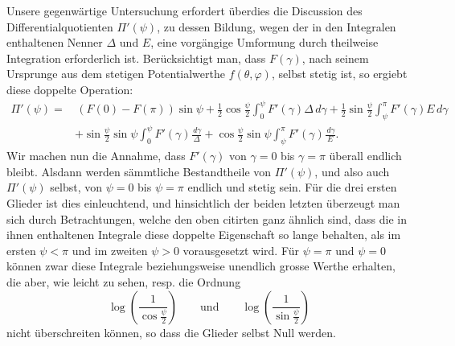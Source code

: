 \documentclass[11pt]{article}
\newcommand{\dd}{\,d}
\begin{document}
Unsere gegenwärtige Untersuchung erfordert überdies die Discussion des Differentialquotienten $\Pi'(\psi)$, zu dessen Bildung, wegen der in den Integralen enthaltenen Nenner $\Delta$ und $E$, eine vorgängige Umformung durch theilweise Integration erforderlich ist. Berücksichtigt man, dass $F(\gamma)$, nach seinem Ursprunge aus dem stetigen Potentialwerthe $f(\theta,\varphi)$, selbst stetig ist, so ergiebt diese doppelte Operation:
\begin{align*}
\Pi'(\psi)=&\,(F(0)-F(\pi))\sin\psi
+\frac12\cos\frac{\psi}{2}\int_0^\psi F'(\gamma)\Delta\dd\gamma
+\frac12\sin\frac{\psi}{2}\int_\psi^\pi F'(\gamma)E\dd\gamma \\
&+\sin\frac{\psi}{2}\sin\psi\int_0^\psi F'(\gamma)\frac{\dd\gamma}{\Delta}
+\cos\frac{\psi}{2}\sin\psi\int_\psi^\pi F'(\gamma)\frac{\dd\gamma}{E}.
\end{align*}
Wir machen nun die Annahme, dass $F'(\gamma)$ von $\gamma=0$ bis $\gamma=\pi$ überall endlich bleibt. Alsdann werden sämmtliche Bestandtheile von $\Pi'(\psi)$, und also auch $\Pi'(\psi)$ selbst, von $\psi=0$ bis $\psi=\pi$ endlich und stetig sein. Für die drei ersten Glieder ist dies einleuchtend, und hinsichtlich der beiden letzten überzeugt man sich durch Betrachtungen, welche den oben citirten ganz ähnlich sind, dass die in ihnen enthaltenen Integrale diese doppelte Eigenschaft so lange behalten, als im ersten $\psi<\pi$ und im zweiten $\psi>0$ vorausgesetzt wird. Für $\psi=\pi$ und $\psi=0$ können zwar diese Integrale beziehungsweise unendlich grosse Werthe erhalten, die aber, wie leicht zu sehen, resp. die Ordnung
\[
 \log\left(\frac1{\cos\frac{\psi}{2}}\right)\qquad\text{und}\qquad
 \log\left(\frac1{\sin\frac{\psi}{2}}\right)
\]
nicht überschreiten können, so dass die Glieder selbst Null werden.
\end{document}
